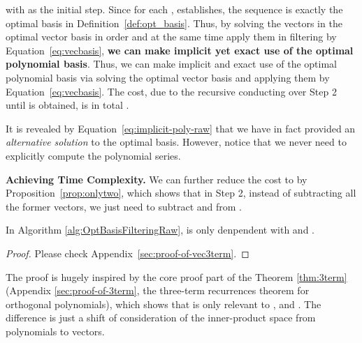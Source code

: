 with  as the initial step.
Since for each , 
 establishes, 
the sequence 
is exactly the optimal basis in Definition~\ref{def:opt_basis}.
Thus, by solving the vectors in the optimal vector basis in order   
and at the same time apply them in filtering by Equation~\eqref{eq:vecbasis}, 
\textbf{we can make implicit yet exact use of the optimal polynomial basis}. 
Thus, 
we can make implicit and exact use of the optimal polynomial basis 
via solving the optimal vector basis and applying them by Equation~\eqref{eq:vecbasis}. 
The cost, due to the recursive conducting over Step 2 until  is obtained, 
is in total . 

\begin{remark}
  It is revealed by Equation~\eqref{eq:implicit-poly-raw} that 
  we have in fact provided an \textit{alternative solution} to the optimal basis.   
  However, notice that we never need to explicitly compute the polynomial series.
\end{remark}


\textbf{Achieving  Time Complexity.\quad} 
We can further reduce the cost to  
by Proposition~\ref{prop:onlytwo}, 
which shows that in Step 2, instead of subtracting all the former vectors, 
we just need to subtract  and  from .

\begin{tcolorbox}[boxrule=0.pt,height=12mm,valign=center,colback=blue!3!white]
  \begin{proposition}
      In Algorithm \ref{alg:OptBasisFilteringRaw},  is only denpendent with  and .
    \label{prop:onlytwo}
    \end{proposition}
\end{tcolorbox}

\begin{proof}
Please check Appendix~\ref{sec:proof-of-vec3term}.
\end{proof}

\begin{remark}
The proof is hugely inspired by the core proof part of the Theorem \ref{thm:3term}
(Appendix \ref{sec:proof-of-3term}, the three-term recurrences theorem for orthogonal
polynomials), which shows that 
{ is only relevant to ,  and }. 
The difference is just a shift of consideration of 
the inner-product space from polynomials to vectors.
\end{remark}

